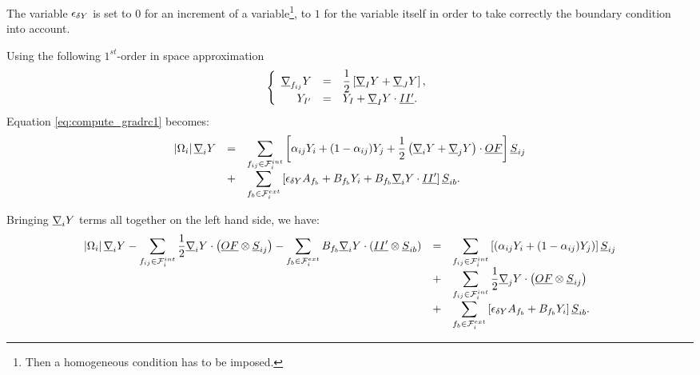 The variable $\epsilon_{\delta Y}$ is set to $0$ for an increment of a variable\footnote{
Then a homogeneous condition has to be imposed.
},
 to $1$ for the variable itself in order to take
correctly the boundary condition into account.

Using the following $1^{st}$-order in space approximation
\begin{equation}\notag
\left\{\begin{array}{r c l}
\underline{\nabla}_{{f_{ij}}} Y & = & \displaystyle \dfrac{1}{2}\left[ \underline{\nabla}_{I} Y + \underline{\nabla}_{J} Y \right],\\
Y_{{I^\prime}} &= & Y_{I} + \underline{\nabla}_{I} Y \cdot \underline{I {I^\prime} } .
\end{array}\right .
\end{equation}
Equation \eqref{eq:compute_gradrc1} becomes:
%
\begin{equation*}
\begin{array}{r c l}
\left| \Omega_{i} \right| \underline{\nabla}_{i} Y &=&
\displaystyle
\sum\limits_{{f_{ij}} \in \mathcal{F}^{int}_{i}}
\left[\alpha_{{ij}} Y_i
+ (1 - \alpha_{{ij}}) Y_j  + \frac{1}{2}
\left( \underline{\nabla}_i Y +\underline{\nabla}_j Y\right) \cdot \underline{O F }  \right] {\underline{S}_{{ij}}}\\
&+& \displaystyle
\sum\limits_{{f_{b}} \in \mathcal{F}^{ext}_{i}}
\left[ \epsilon_{\delta Y}A_{{f_{b}}} +
B_{{f_{b}}} Y_{i} + B_{{f_{b}}} \underline{\nabla}_{i} Y \cdot \underline{I {I^\prime}}
\right] \underline{S}_{{ib}}.
\end{array}
\end{equation*}

Bringing $\underline{\nabla}_i Y$ terms all together on the left hand side, we have:
%
\begin{equation}\label{eq:gradrc_recontruit}
\begin{array}{r c l}
\displaystyle
\left| \Omega_{i} \right| \underline{\nabla}_{i} Y -
\sum\limits_{ {f_{ij}} \in \mathcal{F}^{int}_{i}} \frac{1}{2} \underline{\nabla}_i Y \cdot \left( \underline{O F} \otimes \underline{S}_{{ij}} \right)-
\sum\limits_{ {f_{b}} \in \mathcal{F}^{ext}_{i}} B_{{f_{b}}} \underline{\nabla}_i Y \cdot \left( \underline{I {I^\prime}}  \otimes \underline{S}_{{ib}} \right)
&=&
\displaystyle
\sum\limits_{{f_{ij}} \in \mathcal{F}^{int}_{i}}\left[
(\alpha_{{ij}} Y_i + (1 - \alpha_{{ij}}) Y_j)\right] \underline{S}_{{ij}} \\
&+&
\displaystyle
\sum\limits_{{f_{ij}} \in \mathcal{F}^{int}_{i}} \frac{1}{2} \underline{\nabla}_j Y \cdot \left( \underline{O F} \otimes \underline{S}_{{ij}} \right) \\
&+&
\displaystyle
\sum\limits_{{f_{b}} \in \mathcal{F}^{ext}_{i}}\left[ \epsilon_{\delta Y} A_{{f_{b}}} + B_{{f_{b}}} Y_i \right] \underline{S}_{{ib}}.
\end{array}
\end{equation}

